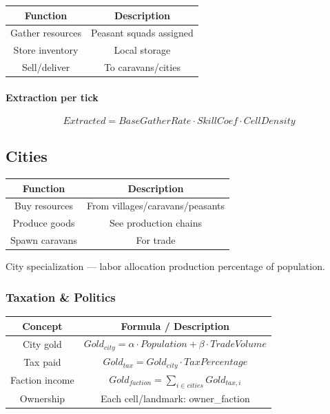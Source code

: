 \documentclass[a4paper,12pt]{article}
\begin{document}
\begin{table}[H]
\centering
\begin{tabular}{|c|c|}
\hline
Function & Description \\
\hline
Gather resources & Peasant squads assigned \\
Store inventory & Local storage \\
Sell/deliver & To caravans/cities \\
\hline
\end{tabular}
\end{table}

\paragraph{Extraction per tick}

\begin{equation}
Extracted = BaseGatherRate \cdot SkillCoef \cdot CellDensity
\end{equation}



\subsection{Cities}

\begin{table}[H]
\centering
\begin{tabular}{|c|c|}
\hline
Function & Description \\
\hline
Buy resources & From villages/caravans/peasants \\
Produce goods & See production chains \\
Spawn caravans & For trade \\
\hline
\end{tabular}
\end{table}

City specialization — labor allocation production percentage of population.



\subsubsection{Taxation \& Politics}

\begin{table}[H]
\centering
\begin{tabular}{|c|c|}
\hline
Concept & Formula / Description \\
\hline
City gold & $Gold_{city} = \alpha \cdot Population + \beta \cdot TradeVolume$ \\
Tax paid & $Gold_{tax} = Gold_{city} \cdot TaxPercentage$ \\
Faction income & $Gold_{faction} = \sum_{i \in cities} Gold_{tax,i}$ \\
Ownership & Each cell/landmark: owner\_faction \\
\hline
\end{tabular}
\end{table}
\end{document}
